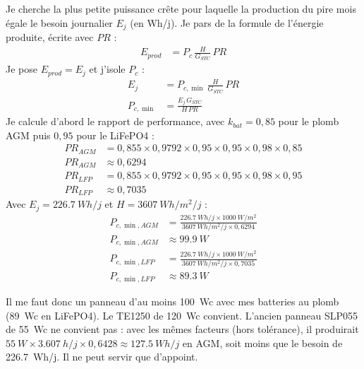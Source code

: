\begin{demonstration}
Je cherche la plus petite puissance crête pour laquelle la production du pire mois égale le besoin journalier $E_j$ (en Wh/j). Je pars de la formule de l'énergie produite, écrite avec $PR$ :
\begin{align*}
E_{prod} &= P_c\,\frac{H}{G_{STC}}\,PR
\end{align*}
Je pose $E_{prod} = E_j$ et j'isole $P_c$ :
\begin{align*}
E_j &= P_{c,\min}\,\frac{H}{G_{STC}}\,PR\\
P_{c,\min} &= \frac{E_j\,G_{STC}}{H\,PR}
\end{align*}
Je calcule d'abord le rapport de performance, avec $k_{bat} = 0{,}85$ pour le plomb AGM puis $0{,}95$ pour le LiFePO4 :
\begin{align*}
PR_{AGM} &= 0{,}855 \times 0{,}9792 \times 0{,}95 \times 0{,}95 \times 0{,}98 \times 0{,}85\\
PR_{AGM} &\approx 0{,}6294\\
PR_{LFP} &= 0{,}855 \times 0{,}9792 \times 0{,}95 \times 0{,}95 \times 0{,}98 \times 0{,}95\\
PR_{LFP} &\approx 0{,}7035
\end{align*}
Avec $E_j = \qty{226,7}{Wh/j}$ et $H = \qty{3607}{Wh/m^2/j}$ :
\begin{align*}
P_{c,\min,AGM} &= \frac{\qty{226,7}{Wh/j} \times \qty{1000}{W/m^2}}{\qty{3607}{Wh/m^2/j} \times 0{,}6294}\\
P_{c,\min,AGM} &\approx \qty{99,9}{W}\\
P_{c,\min,LFP} &= \frac{\qty{226,7}{Wh/j} \times \qty{1000}{W/m^2}}{\qty{3607}{Wh/m^2/j} \times 0{,}7035}\\
P_{c,\min,LFP} &\approx \qty{89,3}{W}
\end{align*}
\end{demonstration}

Il me faut donc un panneau d'au moins \qty{100}{Wc} avec mes batteries au plomb (\qty{89}{Wc} en LiFePO4). Le TE1250 de \qty{120}{Wc} convient. L'ancien panneau SLP055 de \qty{55}{Wc} ne convient pas : avec les mêmes facteurs (hors tolérance), il produirait $\qty{55}{W} \times \qty{3,607}{h/j} \times 0{,}6428 \approx \qty{127,5}{Wh/j}$ en AGM, soit moins que le besoin de \qty{226,7}{Wh/j}. Il ne peut servir que d'appoint.

